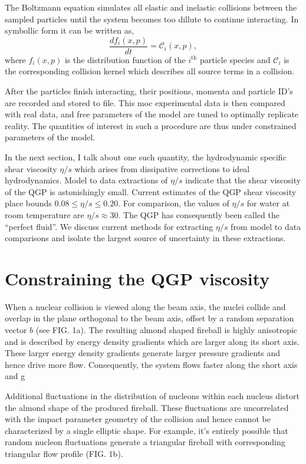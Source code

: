\documentclass[aps,prc,reprint,amsmath,nofootinbib]{revtex4-1}
\begin{document}
The Boltzmann equation simulates all elastic and inelastic collisions between the sampled particles until the system becomes too dillute to continue interacting. In symbollic
form it can be written as,
\begin{equation}
 \label{boltzmann_eqn}
 \frac{df_i(x,p)}{dt} = \mathcal{C}_i (x,p),
\end{equation}
where $f_i(x,p)$ is the distribution function of the $i^\mathrm{th}$ particle species and $\mathcal{C}_i$ is the corresponding collision kernel which describes all source 
terms in a collision.

After the particles finish interacting, their positions, momenta and particle ID's are recorded and stored to file. This moc experimental data is then compared with real
data, and free parameters of the model are tuned to optimally replicate reality. The quantities of interest in such a procedure are thus under constrained parameters of 
the model. 

In the next section, I talk about one such quantity, the hydrodynamic specific shear viscosity $\eta/s$ which arises from dissipative corrections to ideal hydrodynamics.
Model to data extractions of $\eta/s$ indicate that the shear viscosity of the QGP is astonishingly small. Current estimates of the QGP shear viscosity place bounds $0.08 \le \eta/s \le 0.20$. For comparison, the values of $\eta/s$ 
for water at room temperature are $\eta/s \approx 30$. The QGP has consequently been called the ``perfect fluid''. We discuss current methods for extracting $\eta/s$ from
model to data comparisons and isolate the largest source of uncertainty in these extractions.

\section{Constraining the QGP viscosity}

When a nuclear collision is viewed along the beam axis, the nuclei collide and overlap in the plane orthogonal to the beam axis, offset by a random separation vector $b$ 
(see FIG. 1a). The resulting almond shaped fireball is highly anisotropic and is described by energy density gradients which are larger along its short axis. These larger 
energy density gradients generate larger pressure gradients and hence drive more flow. Consequently, the system flows faster along the short axis and g

Additional fluctuations in the distribution of nucleons within each nucleus distort the almond shape of the produced fireball. These fluctuations are uncorrelated with the 
impact parameter geometry of the collision and hence cannot be characterized by a single elliptic shape. For example, it's entirely possible that random nucleon fluctuations
generate a triangular fireball with corresponding triangular flow profile (FIG. 1b). 
\end{document}
